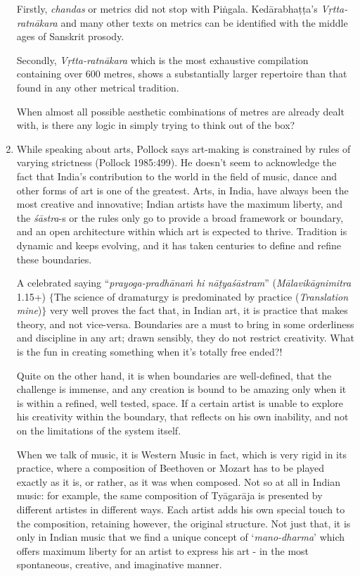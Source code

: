 \begin{enumerate}
Firstly, {\it chandas} or metrics did not stop with Piṅgala. Kedārabhaṭṭa's \textsl{Vṛtta-ratnākara} and many other texts on metrics can be identified with the middle ages of Sanskrit prosody. 

Secondly, {\it Vṛtta-ratnākara} which is the most exhaustive compilation containing over 600 metres,  shows a substantially larger repertoire than that found in any other metrical tradition. 

When almost all possible aesthetic combinations of metres are already dealt with, is there any logic in simply trying to think out of the box?  

\item While speaking about arts, Pollock says art-making is constrained by rules of varying strictness (Pollock 1985:499). He doesn't seem to acknowledge the fact that India's contribution to the world in the field of music, dance and other forms of art is one of the greatest. Arts, in India, have always been the most creative and innovative; Indian artists have the maximum liberty, and the {\it śāstra}-s or the rules only go to provide a broad framework or boundary, and an open architecture within which art is expected to thrive. Tradition is dynamic and keeps evolving, and it has taken centuries to define and refine these boundaries. 

A celebrated saying ``\textsl{prayoga-pradhānaṁ hi nāṭyaśāstram}'' ({\it Māla\-vikāgnimitra} 1.15+) $\{$The science of dramaturgy is predominated by practice (\textsl{Translation mine})$\}$ very well proves the fact that, in Indian art, it is practice that makes theory, and not vice-versa. Boundaries are a must to bring in some orderliness and discipline in any art; drawn sensibly, they do not restrict creativity. What is the fun in creating something when it's totally free ended?! 

Quite on the other hand, it is when boundaries are well-defined, that the challenge is immense, and any creation is bound to be amazing only when it is within a refined, well tested, space. If a certain artist is unable to explore his creativity within the boundary, that reflects on his own inability, and not on the limitations of the system itself. 

When we talk of music, it is Western Music in fact, which is very rigid in its practice, where a composition of Beethoven or Mozart has to be played exactly as it is, or rather, as it was when composed. Not so at all in Indian music: for example, the same composition of Tyāgarāja is presented by different artistes in different ways. Each artist adds his own special touch to the composition, retaining however, the original structure. Not just that, it is only in Indian music that we find a unique concept of `{\it mano-dharma}' which offers maximum liberty for an artist to express his art - in the most spontaneous, creative, and imaginative manner. 


\end{enumerate}
